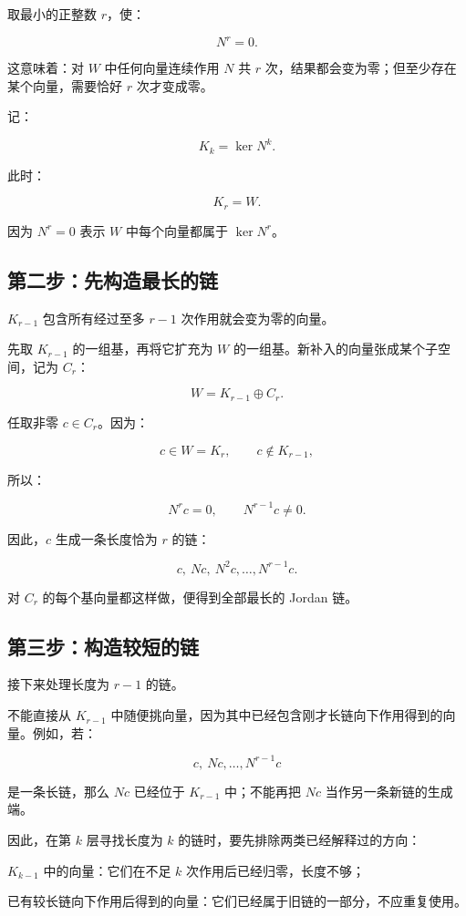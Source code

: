 取最小的正整数 $r$，使：

\[
N^r=0.
\]

这意味着：对 $W$ 中任何向量连续作用 $N$ 共 $r$ 次，结果都会变为零；但至少存在某个向量，需要恰好 $r$ 次才变成零。

记：

\[
K_k=\ker N^k.
\]

此时：

\[
K_r=W.
\]

因为 $N^r=0$ 表示 $W$ 中每个向量都属于 $\ker N^r$。

\subsection{第二步：先构造最长的链}

$K_{r-1}$ 包含所有经过至多 $r-1$ 次作用就会变为零的向量。

先取 $K_{r-1}$ 的一组基，再将它扩充为 $W$ 的一组基。新补入的向量张成某个子空间，记为 $C_r$：

\[
W=K_{r-1}\oplus C_r.
\]

任取非零 $c\in C_r$。因为：

\[
c\in W=K_r,
\qquad
c\notin K_{r-1},
\]

所以：

\[
N^rc=0,
\qquad
N^{r-1}c\ne0.
\]

因此，$c$ 生成一条长度恰为 $r$ 的链：

\[
c,\ Nc,\ N^2c,\ldots,N^{r-1}c.
\]

对 $C_r$ 的每个基向量都这样做，便得到全部最长的 Jordan 链。

\subsection{第三步：构造较短的链}

接下来处理长度为 $r-1$ 的链。

不能直接从 $K_{r-1}$ 中随便挑向量，因为其中已经包含刚才长链向下作用得到的向量。例如，若：

\[
c,\ Nc,\ldots,N^{r-1}c
\]

是一条长链，那么 $Nc$ 已经位于 $K_{r-1}$ 中；不能再把 $Nc$ 当作另一条新链的生成端。

因此，在第 $k$ 层寻找长度为 $k$ 的链时，要先排除两类已经解释过的方向：

\begin{jitem}
\item %
$K_{k-1}$ 中的向量：它们在不足 $k$ 次作用后已经归零，长度不够；
\item %
已有较长链向下作用后得到的向量：它们已经属于旧链的一部分，不应重复使用。
\end{jitem}

